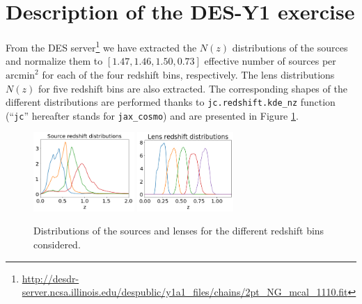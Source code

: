 \documentclass[twocolumn,twocolappendix,nofootinbib,iop]{openjournal}
\begin{document}
\section{Description of the DES-Y1 exercise}
\label{app-DESY1}
From the DES server\footnote{\url{http://desdr-server.ncsa.illinois.edu/despublic/y1a1_files/chains/2pt_NG_mcal_1110.fit}} we have extracted the $N(z)$ distributions of the sources and normalize them to $[1.47, 1.46, 1.50, 0.73]$ effective number of sources per $\mathrm{arcmin}^2$ for each of the four redshift bins, respectively. The lens distributions $N(z)$ for five redshift bins are also extracted. The corresponding shapes of the different distributions are performed thanks to \texttt{jc.redshift.kde\_nz} function (``\texttt{jc}'' hereafter stands for \texttt{jax\_cosmo}) and are presented in Figure \ref{fig-DESY1-src-lens-redshift}.
\begin{figure}
\centering
\includegraphics[height=3cm]{figures/DESY1-source-redshift.png}
\includegraphics[height=3cm]{figures/DESY1-lens-redshift.png}
\caption{Distributions of the sources and lenses for the different redshift bins considered.}
\label{fig-DESY1-src-lens-redshift}
\end{figure}
\end{document}
